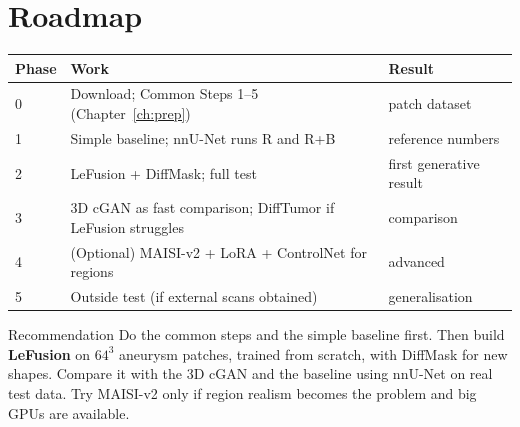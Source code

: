 \documentclass[11pt,a4paper,oneside]{report}
\begin{document}
\section*{Roadmap}
\begin{center}
\small
\begin{tabularx}{\linewidth}{lXl}
\toprule
\textbf{Phase} & \textbf{Work} & \textbf{Result} \\
\midrule
0 & Download; Common Steps 1--5 (Chapter~\ref{ch:prep}) & patch dataset \\
1 & Simple baseline; nnU-Net runs R and R+B & reference numbers \\
2 & LeFusion + DiffMask; full test & first generative result \\
3 & 3D cGAN as fast comparison; DiffTumor if LeFusion struggles & comparison \\
4 & (Optional) MAISI-v2 + LoRA + ControlNet for regions & advanced \\
5 & Outside test (if external scans obtained) & generalisation \\
\bottomrule
\end{tabularx}
\end{center}

\begin{verdict}{Recommendation}
Do the common steps and the simple baseline first. Then build \textbf{LeFusion} on $64^3$ aneurysm patches, trained from scratch, with DiffMask for new shapes. Compare it with the 3D cGAN and the baseline using nnU-Net on real test data. Try MAISI-v2 only if region realism becomes the problem and big GPUs are available.
\end{verdict}

\cleardoublepage{}
\renewcommand{\bibname}{References}
\end{document}
